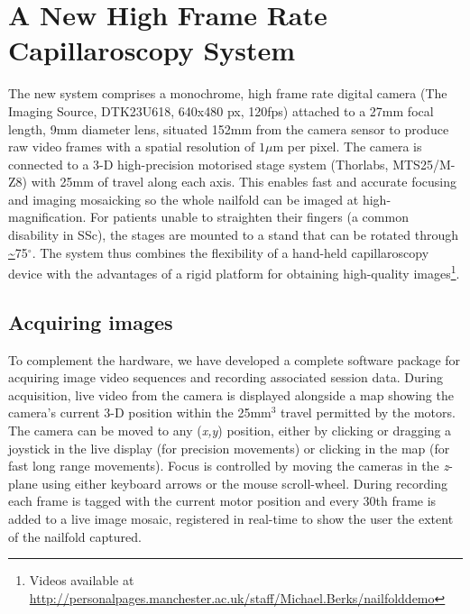 \documentclass[runningheads,a4paper]{llncs}
\def\eg{e.g.}
\def\etc{etc.}
\begin{document}
\section{A New High Frame Rate Capillaroscopy System}
\label{s:new_system}
%
The new system comprises a monochrome, high frame rate digital camera (The Imaging Source, DTK23U618, 640x480 px, 120fps) attached to a  27mm focal length, 9mm diameter lens, situated 152mm from the camera sensor to produce raw video frames with a spatial resolution of $1{\mu}$m per pixel. The camera is connected to a 3-D high-precision motorised stage system (Thorlabs, MTS25/M-Z8) with 25mm of travel along each axis. This enables fast and accurate focusing and imaging mosaicking so the whole nailfold can be imaged at high-magnification. For patients unable to straighten their fingers (a common disability in SSc), the stages are mounted to a stand that can be rotated through \url{~}75$^{\circ}$. The system thus combines the flexibility of a hand-held capillaroscopy device with the advantages of a rigid platform for obtaining high-quality images\footnote{\label{note_supp}Videos available at \url{http://personalpages.manchester.ac.uk/staff/Michael.Berks/nailfolddemo}}. 
%
\subsection{Acquiring images}
%
To complement the hardware, we have developed a complete software package for acquiring image video sequences and recording associated session data. During acquisition, live video from the camera is displayed alongside a map showing the camera’s current 3-D position within the 25mm$^3$ travel permitted by the motors. The camera can be moved to any (\textit{x,y}) position, either by clicking or dragging a joystick in the live display (for precision movements) or clicking in the map (for fast long range movements). Focus is controlled by moving the cameras in the \textit{z}-plane using either keyboard arrows or the mouse scroll-wheel. During recording each frame is tagged with the current motor position and every 30th frame is added to a live image mosaic, registered in real-time to show the user the extent of the nailfold captured\footnotemark[1]. %
%
\end{document}
